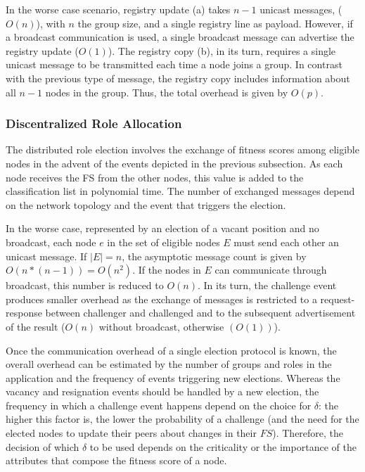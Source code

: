 In the worse case scenario, registry update (a) takes $n-1$ unicast messages, ($O(n)$), with $n$ the group size, and a single registry line as payload. However, if a broadcast communication is used, a single broadcast message can advertise the registry update ($O(1)$).
The registry copy (b), in its turn, requires a single unicast message to be transmitted each time a node joins a group. In contrast with the previous type of message, the registry copy includes information about all $n-1$ nodes in the group. Thus, the total overhead is given by $O(p)$.

\subsubsection{\textbf{Discentralized Role Allocation}} 


The distributed role election involves the exchange of fitness scores among eligible nodes in the advent of the events depicted in the previous subsection. As each node receives the FS from the other nodes, this value is added to the classification list in polynomial time. The number of exchanged messages depend on the network topology and the event that triggers the election. 

In the worse case, represented by an election of a vacant position and no broadcast, each node $e$ in the set of eligible nodes $E$ must send each other an unicast message. If $|E| = n$, the asymptotic message count is given by $O(n * (n-1)) = O(n^2)$. If the nodes in $E$ can communicate through broadcast, this number is reduced to $O(n)$. In its turn, the challenge event produces smaller overhead as the exchange of messages is restricted to a request-response between challenger and challenged and to the subsequent advertisement of the result ($O(n)$ without broadcast, otherwise $(O(1))$).

Once the communication overhead of a single election protocol is known, the overall overhead can be estimated by the number of groups and roles in the application and the frequency of events triggering new elections. Whereas the vacancy and resignation events should be handled by a new election, the frequency in which a challenge event happens depend on the choice for $\delta$: the higher this factor is, the lower the probability of a challenge (and the need for the elected nodes to update their peers about changes in their $FS$). Therefore, the decision of which $\delta$ to be used depends on the criticality or the importance of the attributes that compose the fitness score of a node. 

